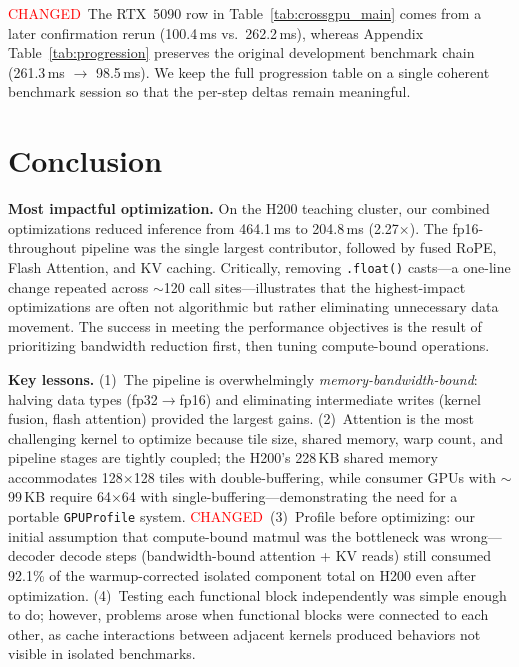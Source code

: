 \documentclass{article}
\newcommand{\chg}[1]{{\color{blue}#1}}
\newcommand{\chglabel}{{\setlength{\fboxsep}{1pt}\colorbox{yellow!45}{\textcolor{red}{\scriptsize CHANGED}}}}
\begin{document}
\chglabel\ \chg{The RTX~5090 row in Table~\ref{tab:crossgpu_main} comes from a later confirmation rerun (100.4\,ms vs.\ 262.2\,ms), whereas Appendix Table~\ref{tab:progression} preserves the original development benchmark chain (261.3\,ms $\rightarrow$ 98.5\,ms).  We keep the full progression table on a single coherent benchmark session so that the per-step deltas remain meaningful.}

\section{Conclusion}\label{sec:conclusion}

\textbf{Most impactful optimization.}
On the H200 teaching cluster, our combined optimizations reduced inference from 464.1\,ms to 204.8\,ms (2.27$\times$).  The fp16-throughout pipeline was the single largest contributor, followed by fused RoPE, Flash Attention, and KV caching.  Critically, removing \texttt{.float()} casts---a one-line change repeated across $\sim$120 call sites---illustrates that the highest-impact optimizations are often not algorithmic but rather eliminating unnecessary data movement.
The success in meeting the performance objectives is the result of prioritizing bandwidth reduction first, then tuning compute-bound operations.

\textbf{Key lessons.}
(1)~The pipeline is overwhelmingly \emph{memory-bandwidth-bound}: halving data types (fp32$\to$fp16) and eliminating intermediate writes (kernel fusion, flash attention) provided the largest gains.
(2)~Attention is the most challenging kernel to optimize because tile size, shared memory, warp count, and pipeline stages are tightly coupled; the H200's 228\,KB shared memory accommodates 128$\times$128 tiles with double-buffering, while consumer GPUs with $\sim$99\,KB require 64$\times$64 with single-buffering---demonstrating the need for a portable \texttt{GPUProfile} system.
\chglabel\ \chg{(3)~Profile before optimizing: our initial assumption that compute-bound matmul was the bottleneck was wrong---decoder decode steps (bandwidth-bound attention + KV reads) still consumed 92.1\% of the warmup-corrected isolated component total on H200 even after optimization.}
(4)~Testing each functional block independently was simple enough to do; however, problems arose when functional blocks were connected to each other, as cache interactions between adjacent kernels produced behaviors not visible in isolated benchmarks.
\end{document}
